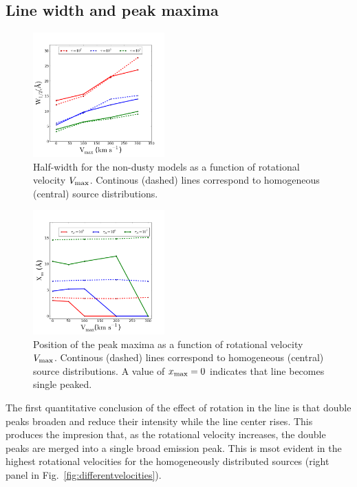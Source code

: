 \documentclass[usenatbib]{mn2e}
\newcommand{\ly}{{\ifmmode{{\rm Ly}\alpha~}\else{Ly$\alpha$~}\fi}}
\begin{document}
\subsection{Line width and peak maxima}
\label{sec:widthpeak}


\begin{figure}
    \includegraphics[width=0.45\textwidth]{WidthvsVmax.png}
    \caption{Half-width for the non-dusty models as a function of
      rotational velocity $V_{\rm max}$. Continous (dashed) lines
      correspond to homogeneous (central) source
      distributions. \label{fig:widthvsvelocity}} 
\end{figure}


\begin{figure}
    \includegraphics[width=0.45\textwidth]{maximumvsVmax.png}
\caption{Position of the peak maxima as a function of rotational
  velocity $V_{\rm max}$. Continous (dashed) lines correspond to
  homogeneous (central) source distributions. A value of $x_{\rm
    max}=0$ indicates that line becomes single
  peaked. \label{fig:maximumsvsvelocity}}  
\end{figure}

The first quantitative conclusion of the effect of rotation in the
\ly line is that double peaks broaden and reduce their intensity
while the line center rises. This produces the impresion that, as the
rotational velocity increases, the double peaks are merged into a
single broad emission peak. This is msot evident in the highest
rotational velocities for the homogeneously distributed sources
(right panel in Fig.~\ref{fig:differentvelocities}). 
\end{document}
